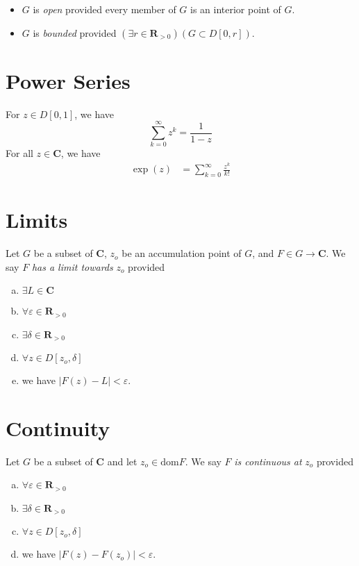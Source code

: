 \documentclass[letterpaper,landscape,9pt,fleqn]{extarticle}
\newcommand{\dom}{\mathrm{dom}}
\newcommand{\reals}{\mathbf{R}}
\newcommand{\complex}{\mathbf{C}}
\newenvironment{alphalist}{
  \begin{enumerate}[(a)]
    \addtolength{\itemsep}{-1.0\itemsep}}
  {\end{enumerate}}
\begin{document}
\begin{multicols*}{3}
\begin{itemize}
  \item $G$ is \emph{open} provided every member of $G$ is an
  interior point of $G$.

  \item $G$ is \emph{bounded} provided 
    $(\exists r \in \reals_{> 0})(G \subset D[0,r])$.


  
\end{itemize}

\section*{Power Series}
For $z \in D[0,1]$, we have
\begin{equation*}
  \sum_{k=0}^\infty z^k = \frac{1}{1-z}
\end{equation*}
For all $z \in \complex$, we have
\begin{align*}
   \exp(z) &= \sum_{k=0}^\infty \frac{z^k}{k!}
\end{align*}

\section*{Limits}

Let $G$ be a subset of $\complex$, $z_o$ be an accumulation point of $G$, and $F \in G \to \complex$.
We say $F$ \emph{has a limit towards} $z_o$ provided
\begin{alphalist}
\item $\exists L \in \complex$
\item $\forall \varepsilon \in \reals_{>0}$
\item $\exists \delta  \in \reals_{>0}$
\item $\forall z \in D[z_o, \delta] $
\item we have $|F(z) - L| < \varepsilon$.
\end{alphalist}

\section*{Continuity}

Let $G$ be a subset of $\complex$ and let $z_o \in \dom{F}$. We say $F$ \emph{is continuous at} $z_o$ provided
\begin{alphalist}
\item $\forall \varepsilon \in \reals_{>0}$
\item $\exists \delta  \in \reals_{>0}$
\item $\forall z \in D[z_o, \delta] $
\item we have $|F(z) - F(z_o)| < \varepsilon$.
\end{alphalist}


\end{multicols*}
\end{document}
